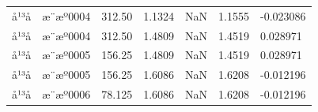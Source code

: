 \documentclass[UTF8,10pt,a4paper,fontset=fandol]{ctexart}
\newcommand{\fieldvalue}[1]{#1}
\begin{document}
\begin{center}
\begin{center}
\begin{tabularx}{\textwidth}{l l l l l l l}
å¹³å &
\fieldvalue{æ¨æº0004} &
\fieldvalue{312.50} &
\fieldvalue{1.1324} &
\fieldvalue{NaN} &
\fieldvalue{1.1555} &
\fieldvalue{-0.023086} \\

å¹³å &
\fieldvalue{æ¨æº0004} &
\fieldvalue{312.50} &
\fieldvalue{1.4809} &
\fieldvalue{NaN} &
\fieldvalue{1.4519} &
\fieldvalue{0.028971} \\

å¹³å &
\fieldvalue{æ¨æº0005} &
\fieldvalue{156.25} &
\fieldvalue{1.4809} &
\fieldvalue{NaN} &
\fieldvalue{1.4519} &
\fieldvalue{0.028971} \\

å¹³å &
\fieldvalue{æ¨æº0005} &
\fieldvalue{156.25} &
\fieldvalue{1.6086} &
\fieldvalue{NaN} &
\fieldvalue{1.6208} &
\fieldvalue{-0.012196} \\

å¹³å &
\fieldvalue{æ¨æº0006} &
\fieldvalue{78.125} &
\fieldvalue{1.6086} &
\fieldvalue{NaN} &
\fieldvalue{1.6208} &
\fieldvalue{-0.012196} \\


\end{tabularx}
\end{center}
\end{center}
\end{document}
